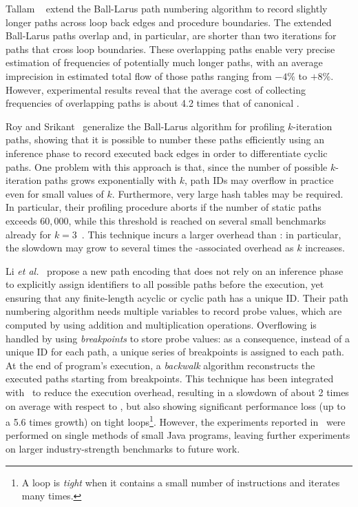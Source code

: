 Tallam \etal~\cite{Tallam04} extend the Ball-Larus path numbering algorithm to record slightly longer paths across loop back edges and procedure boundaries. The extended Ball-Larus paths overlap and, in particular, are shorter than two iterations for paths that cross loop boundaries. These overlapping paths enable very precise estimation of frequencies of potentially much longer paths, with an average imprecision in estimated total flow of those paths ranging from $-4\%$ to $+8\%$. However, experimental results reveal that the average cost of collecting frequencies of overlapping paths is about 4.2 times that of canonical \blpp.

Roy and Srikant~\cite{Roy09} generalize the Ball-Larus algorithm for profiling $k$-iteration paths, showing that it is possible to number these paths efficiently using an inference phase to record executed back edges in order to differentiate cyclic paths. One problem with this approach is that, since the number of possible $k$-iteration paths grows exponentially with $k$, path IDs may overflow in practice even for small values of $k$. Furthermore, very large hash tables may be required. In particular, their profiling procedure aborts if the number of static paths exceeds $60,000$, while this threshold is reached on several small benchmarks already for $k=3$~\cite{Li12}. This technique incurs a larger overhead than \blpp: in particular, the slowdown may grow to several times the \blpp-associated overhead as $k$ increases.

Li {\em et al.}~\cite{Li12} propose a new path encoding that does not rely on an inference phase to explicitly assign identifiers to all possible paths before the execution, yet ensuring that any finite-length acyclic or cyclic path has a unique ID. Their path numbering algorithm needs multiple variables to record probe values, which are computed by using addition and multiplication operations. Overflowing is handled by using {\em breakpoints} to store probe values: as a consequence, instead of a unique ID for each path, a unique series of breakpoints is assigned to each path. At the end of program's execution, a {\em backwalk} algorithm reconstructs the executed paths starting from breakpoints. This technique has been integrated with \blpp\ to reduce the execution overhead, resulting in a slowdown of about 2 times on average with respect to \blpp, but also showing significant performance loss (up to a 5.6 times growth) on tight loops\footnote{A loop is {\em tight} when it contains a small number of instructions and iterates many times.}. However, the experiments reported in~\cite{Li12} were performed on single methods of small Java programs, leaving further experiments on larger industry-strength benchmarks to future work.

